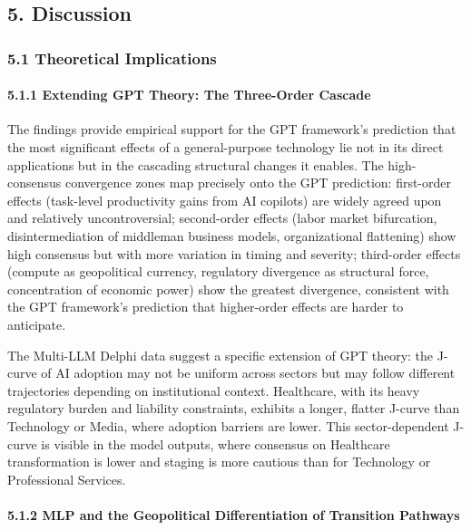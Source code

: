 \documentclass{article}
\begin{document}
\subsection{5. Discussion}
\label{sec:5_discussion}


\subsubsection{5.1 Theoretical Implications}
\label{sec:5_1_theoretical_implications}


\paragraph{5.1.1 Extending GPT Theory: The Three-Order Cascade}

The findings provide empirical support for the GPT framework's prediction that the most significant effects of a general-purpose technology lie not in its direct applications but in the cascading structural changes it enables. The high-consensus convergence zones map precisely onto the GPT prediction: first-order effects (task-level productivity gains from AI copilots) are widely agreed upon and relatively uncontroversial; second-order effects (labor market bifurcation, disintermediation of middleman business models, organizational flattening) show high consensus but with more variation in timing and severity; third-order effects (compute as geopolitical currency, regulatory divergence as structural force, concentration of economic power) show the greatest divergence, consistent with the GPT framework's prediction that higher-order effects are harder to anticipate.

The Multi-LLM Delphi data suggest a specific extension of GPT theory: the J-curve of AI adoption may not be uniform across sectors but may follow different trajectories depending on institutional context. Healthcare, with its heavy regulatory burden and liability constraints, exhibits a longer, flatter J-curve than Technology or Media, where adoption barriers are lower. This sector-dependent J-curve is visible in the model outputs, where consensus on Healthcare transformation is lower and staging is more cautious than for Technology or Professional Services.


\paragraph{5.1.2 MLP and the Geopolitical Differentiation of Transition Pathways}
\end{document}
